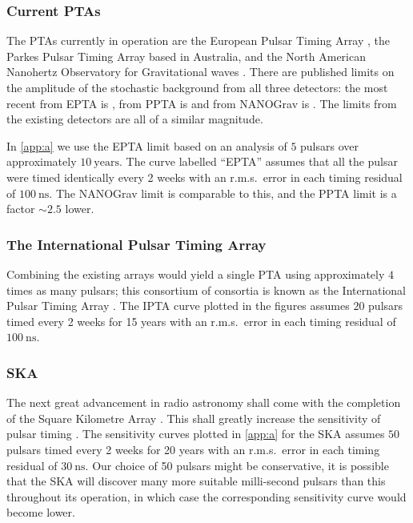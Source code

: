 \subsubsection{Current PTAs}

The PTAs currently in operation are the European Pulsar Timing Array \citep[EPTA\footnote{\url{http://www.epta.eu.org/}};][]{eptareview2013}, the Parkes Pulsar Timing Array \citep[PPTA\footnote{\url{http://www.atnf.csiro.au/research/pulsar/ppta/}};][]{parkesreview2013} based in Australia, and the North American Nanohertz Observatory for Gravitational waves \citep[NANOGrav\footnote{\url{http://nanograv.org/}};][]{nanogravreview2013}. There are published limits on the amplitude of the stochastic background from all three detectors: the most recent from EPTA is \citet{Haasteren}, from PPTA is \citet{Shannon2013} and from NANOGrav is \citet{2013ApJ...762...94D}. The limits from the existing detectors are all of a similar magnitude.

In \ref{app:a} we use the EPTA limit based on an analysis of $5$ pulsars over approximately $10~\mathrm{years}$. The curve labelled ``EPTA'' assumes that all the pulsar were timed identically every 2 weeks with an r.m.s.\ error in each timing residual of $100~\textrm{ns}$. The NANOGrav limit is comparable to this, and the PPTA limit is a factor $\sim 2.5$ lower.

\subsubsection{The International Pulsar Timing Array}

Combining the existing arrays would yield a single PTA using approximately $4$ times as many pulsars; this consortium of consortia is known as the International Pulsar Timing Array \citep[IPTA\footnote{\url{http://www.ipta4gw.org/}};][]{iptareview2013}. The IPTA curve plotted in the figures assumes $20$ pulsars timed every 2 weeks for 15 years with an r.m.s.\ error in each timing residual of $100~\textrm{ns}$.

\subsubsection{SKA}

The next great advancement in radio astronomy shall come with the completion of the Square Kilometre Array \citep[SKA;][]{Dewdney2009}. This shall greatly increase the sensitivity of pulsar timing \citep{Kramer2004}. The sensitivity curves plotted in \ref{app:a} for the SKA assumes $50$ pulsars timed every 2 weeks for 20 years with an r.m.s.\ error in each timing residual of $30~\textrm{ns}$. Our choice of 50 pulsars might be conservative, it is possible that the SKA will discover many more suitable milli-second pulsars than this throughout its operation, in which case the corresponding sensitivity curve would become lower.

